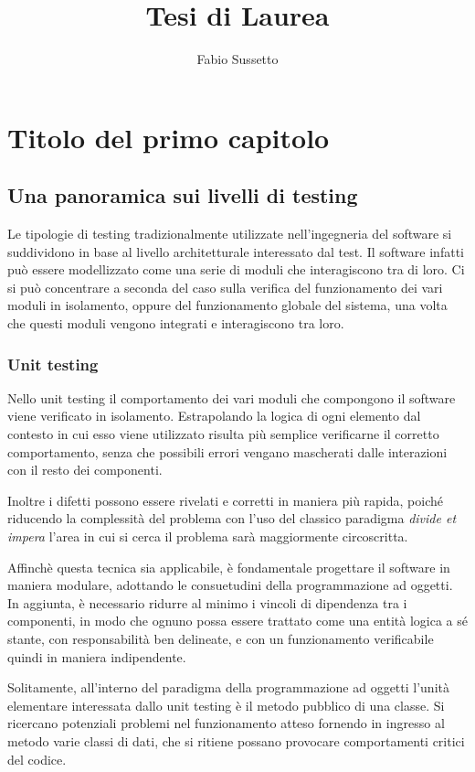 \documentclass[12pt]{toptesi}
\begin{document}
\title{Tesi di Laurea}
\author{Fabio Sussetto}
\maketitle

\chapter{Titolo del primo capitolo}

\section{Una panoramica sui livelli di testing}

Le tipologie di testing tradizionalmente utilizzate nell'ingegneria del software si suddividono in base al livello architetturale interessato dal test.
Il software infatti può essere modellizzato come una serie di moduli che interagiscono tra di loro. Ci si può concentrare a seconda del caso sulla verifica del funzionamento dei vari moduli in isolamento, oppure del funzionamento globale del sistema, una volta che questi moduli vengono integrati e interagiscono tra loro.

\subsection{Unit testing}
Nello unit testing il comportamento dei vari moduli che compongono il software viene verificato in isolamento. Estrapolando la logica di ogni elemento dal contesto in cui esso viene utilizzato risulta più semplice verificarne il corretto comportamento, senza che possibili errori vengano mascherati dalle interazioni con il resto dei componenti. 

Inoltre i difetti possono essere rivelati e corretti in maniera più rapida, poiché riducendo la complessità del problema con l'uso del classico paradigma \emph{divide et impera} l'area in cui si cerca il problema sarà maggiormente circoscritta.

Affinchè questa tecnica sia applicabile, è fondamentale progettare il software in maniera modulare, adottando le consuetudini della programmazione ad oggetti. In aggiunta, è necessario ridurre al minimo i vincoli di dipendenza tra i componenti, in modo che ognuno possa essere trattato come una entità logica a sé stante, con responsabilità ben delineate, e con un funzionamento verificabile quindi in maniera indipendente.

Solitamente, all'interno del paradigma della programmazione ad oggetti l'unità elementare interessata dallo unit testing è il metodo pubblico di una classe. Si ricercano potenziali problemi nel funzionamento atteso fornendo in ingresso al metodo
varie classi di dati, che si ritiene possano provocare comportamenti critici del codice. 
\end{document}
